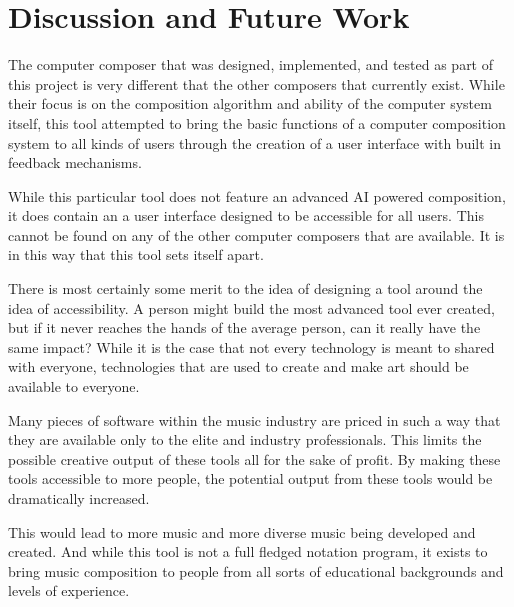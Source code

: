 \chapter{Discussion and Future Work}  
\label{ch:discussionandfuturework}

The computer composer that was designed, implemented, and tested as part of this project is very different that the other composers that currently exist.  While their focus is on the composition algorithm and ability of the computer system itself, this tool attempted to bring the basic functions of a computer composition system to all kinds of users through the creation of a user interface with built in feedback mechanisms.

\vspace{\baselineskip}

While this particular tool does not feature an advanced AI powered composition, it does contain an a user interface designed to be accessible for all users.  This cannot be found on any of the other computer composers that are available.  It is in this way that this tool sets itself apart.

\vspace{\baselineskip}

There is most certainly some merit to the idea of designing a tool around the idea of accessibility.  A person might build the most advanced tool ever created, but if it never reaches the hands of the average person, can it really have the same impact?  While it is the case that not every technology is meant to shared with everyone, technologies that are used to create and make art should be available to everyone.

\vspace{\baselineskip}

Many pieces of software within the music industry are priced in such a way that they are available only to the elite and industry professionals.  This limits the possible creative output of these tools all for the sake of profit.  By making these tools accessible to more people, the potential output from these tools would be dramatically increased.

\vspace{\baselineskip}

This would lead to more music and more diverse music being developed and created.  And while this tool is not a full fledged notation program, it exists to bring music composition to people from all sorts of educational backgrounds and levels of experience.

